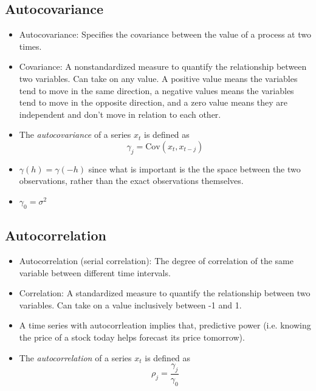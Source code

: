 \documentclass[11pt]{article}
\begin{document}
\subsection{Autocovariance}
\begin{itemize}
    \item Autocovariance: Specifies the covariance between the value of a process at two times.
    \item Covariance: A nonstandardized measure to quantify the relationship between two 
    variables. Can take on any value. A positive value means the variables tend to move in the 
    same direction, a negative values means the variables tend to move in the opposite 
    direction, and a zero value means they are independent and don't move in relation to each 
    other.
    \item The \textit{autocovariance} of a series $x_t$ is defined as 
    \[\gamma_j = \text{Cov}(x_t, x_{t-j})\]
    \item $\gamma(h) = \gamma(-h)$ since what is important is the the space between the two 
    observations, rather than the exact observations themselves. 
    \item $\gamma_0 = \sigma^2$
\end{itemize}

\subsection{Autocorrelation}
\begin{itemize}
    \item Autocorrelation (serial correlation): The degree of correlation of the same variable 
    between different time intervals.
    \item Correlation: A standardized measure to quantify the relationship between two 
    variables. Can take on a value inclusively between -1 and 1.
    \item A time series with autocorrleation implies that, predictive power (i.e. knowing the
    price of a stock today helps forecast its price tomorrow).
    \item The \textit{autocorrelation} of a series $x_t$ is defined as 
    \[\rho_j = \frac{\gamma_j}{\gamma_0}\]
\end{itemize}
\end{document}
